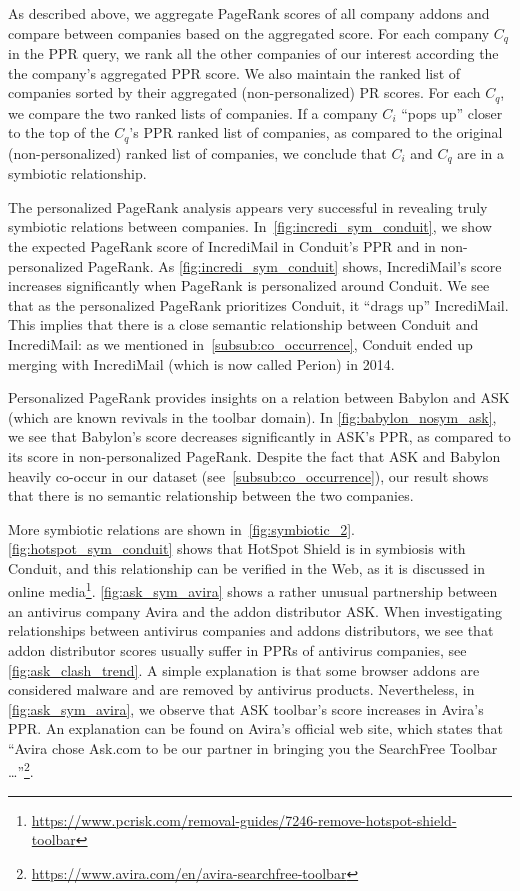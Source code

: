 \documentclass[11pt,oneside]{book}
\begin{document}
As described above, we aggregate PageRank scores of all company addons and compare between companies based on the aggregated score. For each company $C_q$ in the PPR query, we rank all the other companies of our interest according the the company's aggregated PPR score. We also maintain the ranked list of companies sorted by their aggregated (non-personalized) PR scores. For each $C_q$, we compare the two ranked lists of companies. If a company $C_i$ ``pops up'' closer to the top of the $C_q$'s PPR ranked list of companies, as compared to the original (non-personalized) ranked list of companies, we conclude that $C_i$ and $C_q$ are in a symbiotic relationship. 


The personalized PageRank analysis appears very successful in revealing truly symbiotic relations between companies.
In~\autoref{fig:incredi_sym_conduit}, we show the expected PageRank score of IncrediMail in Conduit's PPR and in non-personalized PageRank. As  \autoref{fig:incredi_sym_conduit} shows, IncrediMail's score increases significantly when PageRank is personalized around Conduit. We see that as the personalized PageRank prioritizes Conduit, it ``drags up'' IncrediMail. This implies that there is a close semantic relationship between Conduit and IncrediMail: as we mentioned in~\autoref{subsub:co_occurrence}, Conduit ended up merging with IncrediMail (which is now called Perion) in 2014. 

Personalized PageRank provides insights on a relation between Babylon and ASK (which are known revivals in the toolbar domain). In \autoref{fig:babylon_nosym_ask}, we see that Babylon's score decreases significantly in ASK's PPR, as compared to its score in non-personalized PageRank. Despite the fact that ASK and Babylon heavily co-occur in our dataset (see~\autoref{subsub:co_occurrence}), our result shows that there is no semantic relationship between the two companies. 

More symbiotic relations are shown in~\autoref{fig:symbiotic_2}. \autoref{fig:hotspot_sym_conduit} shows that HotSpot Shield is in symbiosis with Conduit, and this relationship can be verified in the Web, as it is discussed in online media\footnote{\url{https://www.pcrisk.com/removal-guides/7246-remove-hotspot-shield-toolbar}}. \autoref{fig:ask_sym_avira} shows a rather unusual partnership between an antivirus company Avira and the addon distributor ASK. When investigating relationships between antivirus companies and addons distributors, we see that addon distributor scores usually suffer in PPRs of antivirus companies, see \autoref{fig:ask_clash_trend}. A simple explanation is that some browser addons are considered malware and are removed by antivirus products. Nevertheless, in \autoref{fig:ask_sym_avira}, we observe that ASK toolbar's score increases in Avira's PPR. An explanation can be found on Avira's official web site, which states that ``Avira chose Ask.com to be our partner in bringing you the SearchFree Toolbar \dots''\footnote{\url{https://www.avira.com/en/avira-searchfree-toolbar}}. 
\end{document}
